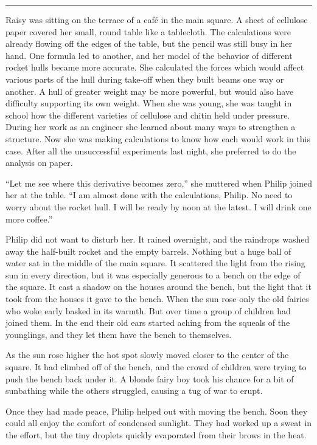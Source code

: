 \documentclass[10pt, draft]{memoir}
\renewcommand{\pfbreakdisplay}{\bigskip \ding{166} \bigskip}
\newcommand{\secbreak}{\fancybreak{\pfbreakdisplay}}
\begin{document}
\secbreak

Raisy was sitting on the terrace of a café in the main square. A sheet of cellulose paper covered her small, round table like a tablecloth. The calculations were already flowing off the edges of the table, but the pencil was still busy in her hand. One formula led to another, and her model of the behavior of different rocket hulls became more accurate. She calculated the forces which would affect various parts of the hull during take-off when they built beams one way or another. A hull of greater weight may be more powerful, but would also have difficulty supporting its own weight. When she was young, she was taught in school how the different varieties of cellulose and chitin held under pressure. During her work as an engineer she learned about many ways to strengthen a structure. Now she was making calculations to know how each would work in this case. After all the unsuccessful experiments last night, she preferred to do the analysis on paper.

``Let me see where this derivative becomes zero,'' she muttered when Philip joined her at the table. ``I am almost done with the calculations, Philip. No need to worry about the rocket hull. I will be ready by noon at the latest. I will drink one more coffee.''

Philip did not want to disturb her. It rained overnight, and the raindrops washed away the half-built rocket and the empty barrels. Nothing but a huge ball of water sat in the middle of the main square. It scattered the light from the rising sun in every direction, but it was especially generous to a bench on the edge of the square. It cast a shadow on the houses around the bench, but the light that it took from the houses it gave to the bench. When the sun rose only the old fairies who woke early basked in its warmth. But over time a group of children had joined them. In the end their old ears started aching from the squeals of the younglings, and they let them have the bench to themselves.

As the sun rose higher the hot spot slowly moved closer to the center of the square. It had climbed off of the bench, and the crowd of children were trying to push the bench back under it. A blonde fairy boy took his chance for a bit of sunbathing while the others struggled, causing a tug of war to erupt.

Once they had made peace, Philip helped out with moving the bench. Soon they could all enjoy the comfort of condensed sunlight. They had worked up a sweat in the effort, but the tiny droplets quickly evaporated from their brows in the heat.
\end{document}
